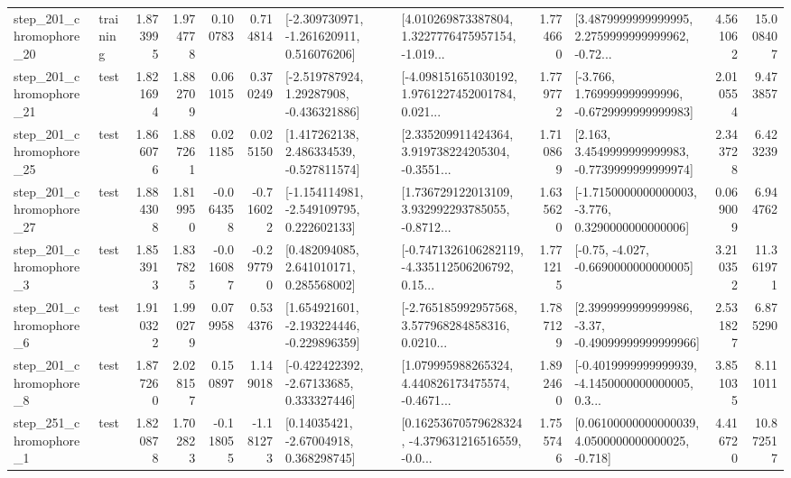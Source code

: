 \begin{tabular}{llrrrrllrlrr}
  step\_201\_chromophore\_20 &  training &      1.873995 &    1.974778 &      0.100783 &  0.714814 &   [-2.309730971, -1.261620911, 0.516076206] &  [4.010269873387804, 1.3227776475957154, -1.019... &       1.774660 &  [3.4879999999999995, 2.2759999999999962, -0.72... &            4.561062 &         15.008407 \\
  step\_201\_chromophore\_21 &      test &      1.821694 &    1.882709 &      0.061015 &  0.370249 &    [-2.519787924, 1.29287908, -0.436321886] &  [-4.098151651030192, 1.9761227452001784, 0.021... &       1.779772 &   [-3.766, 1.769999999999996, -0.6729999999999983] &            2.010554 &          9.473857 \\
  step\_201\_chromophore\_25 &      test &      1.866076 &    1.887261 &      0.021185 &  0.025150 &    [1.417262138, 2.486334539, -0.527811574] &  [2.335209911424364, 3.919738224205304, -0.3551... &       1.710869 &   [2.163, 3.4549999999999983, -0.7739999999999974] &            2.343728 &          6.423239 \\
  step\_201\_chromophore\_27 &      test &      1.884308 &    1.819950 &     -0.064358 & -0.716022 &   [-1.154114981, -2.549109795, 0.222602133] &  [1.736729122013109, 3.932992293785055, -0.8712... &       1.635620 &  [-1.7150000000000003, -3.776, 0.3290000000000006] &            0.069009 &          6.944762 \\
   step\_201\_chromophore\_3 &      test &      1.853913 &    1.837825 &     -0.016087 & -0.297790 &     [0.482094085, 2.641010171, 0.285568002] &  [-0.7471326106282119, -4.335112506206792, 0.15... &       1.771215 &               [-0.75, -4.027, -0.6690000000000005] &            3.210352 &         11.361971 \\
   step\_201\_chromophore\_6 &      test &      1.910322 &    1.990279 &      0.079958 &  0.534376 &   [1.654921601, -2.193224446, -0.229896359] &  [-2.765185992957568, 3.577968284858316, 0.0210... &       1.787129 &  [2.3999999999999986, -3.37, -0.49099999999999966] &            2.531827 &          6.875290 \\
   step\_201\_chromophore\_8 &      test &      1.877260 &    2.028157 &      0.150897 &  1.149018 &    [-0.422422392, -2.67133685, 0.333327446] &  [1.079995988265324, 4.440826173475574, -0.4671... &       1.892460 &  [-0.4019999999999939, -4.1450000000000005, 0.3... &            3.851035 &          8.111011 \\
   step\_251\_chromophore\_1 &      test &      1.820878 &    1.702823 &     -0.118055 & -1.181273 &      [0.14035421, -2.67004918, 0.368298745] &  [0.16253670579628324, -4.379631216516559, -0.0... &       1.755746 &  [0.06100000000000039, 4.0500000000000025, -0.718] &            4.416720 &         10.872517 \\

\end{tabular}

